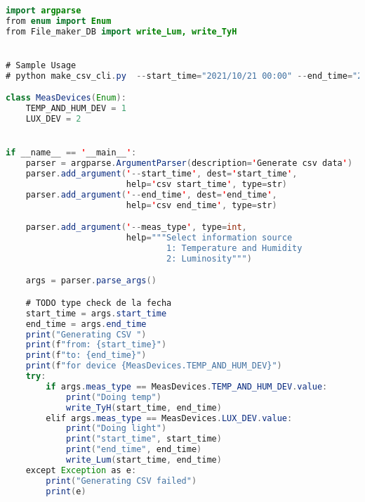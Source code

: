 \begin{lstlisting}[language=Java]
import argparse
from enum import Enum
from File_maker_DB import write_Lum, write_TyH


# Sample Usage
# python make_csv_cli.py  --start_time="2021/10/21 00:00" --end_time="2021/10/22 00:00" --meas_type=2

class MeasDevices(Enum):
    TEMP_AND_HUM_DEV = 1
    LUX_DEV = 2


if __name__ == '__main__':
    parser = argparse.ArgumentParser(description='Generate csv data')
    parser.add_argument('--start_time', dest='start_time',
                        help='csv start_time', type=str)
    parser.add_argument('--end_time', dest='end_time',
                        help='csv end_time', type=str)

    parser.add_argument('--meas_type', type=int,
                        help="""Select information source
                                1: Temperature and Humidity
                                2: Luminosity""")

    args = parser.parse_args()

    # TODO type check de la fecha
    start_time = args.start_time
    end_time = args.end_time
    print("Generating CSV ")
    print(f"from: {start_time}")
    print(f"to: {end_time}")
    print(f"for device {MeasDevices.TEMP_AND_HUM_DEV}")
    try:
        if args.meas_type == MeasDevices.TEMP_AND_HUM_DEV.value:
            print("Doing temp")
            write_TyH(start_time, end_time)
        elif args.meas_type == MeasDevices.LUX_DEV.value:
            print("Doing light")
            print("start_time", start_time)
            print("end_time", end_time)
            write_Lum(start_time, end_time)
    except Exception as e:
        print("Generating CSV failed")
        print(e)


\end{lstlisting}



